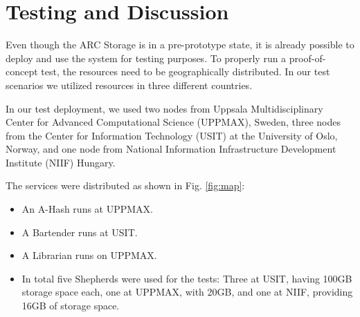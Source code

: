 \documentclass[final]{ieee}
\begin{document}
\section{Testing and Discussion}
\label{Testing and Discussion}

Even though the ARC Storage is in a pre-prototype state, it is already
possible to deploy and use the system for testing purposes. To
properly run a proof-of-concept test, the resources need to be
geographically distributed. In our test scenarios we utilized
resources in three different countries.

In our test deployment, we used two nodes from Uppsala
Multidisciplinary Center for Advanced Computational Science (UPPMAX), Sweden, 
three nodes from the Center for Information Technology (USIT) at the
University of Oslo, Norway, 
and one node from National Information Infrastructure Development Institute (NIIF)
Hungary. %

The services were distributed as shown in Fig. \ref{fig:map}:
\begin{itemize}
\item An A-Hash runs at UPPMAX.
\item A Bartender runs at USIT.
\item A Librarian runs on UPPMAX.
\item In total five Shepherds were used for the tests: Three at USIT, having
  100GB storage space each, one at UPPMAX, with 20GB, and one at NIIF, providing 16GB of storage space.
 \end{itemize}
\end{document}
